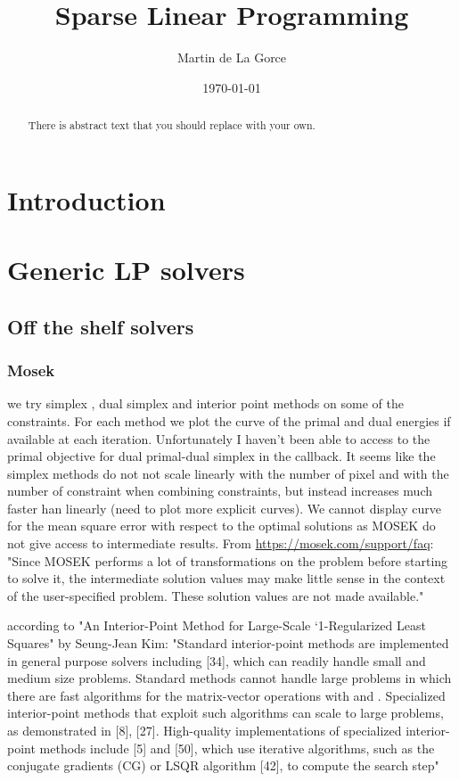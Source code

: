 \documentclass[11pt]{article}
\begin{document}
\title{Sparse Linear Programming}
\author{Martin de La Gorce}
\date{\today}
\maketitle

\begin{abstract}
    There is abstract text that you should replace with your own. 
\end{abstract}


\tableofcontents

\section{Introduction}


\section{Generic LP solvers}
 \subsection{Off the shelf solvers}
\subsubsection{Mosek}

we try simplex , dual simplex and interior point methods on some of the constraints. For each method we plot the curve of the primal and dual energies if available at each iteration. Unfortunately I haven't been able to access to the primal objective for dual primal-dual simplex in the callback. It seems like the simplex methods do not not scale linearly with the number of pixel and with the number of constraint when combining constraints, but instead increases much faster han linearly (need to plot more explicit curves).
We cannot display curve for the mean square error with respect to the optimal solutions as MOSEK do not give access to intermediate results. From \url{https://mosek.com/support/faq}: "Since MOSEK performs a lot of transformations on the problem before starting to solve it, the intermediate solution values may make little sense in the context of the user-specified problem. These solution values are not made available."



according to "An Interior-Point Method for Large-Scale
`1-Regularized Least Squares" by Seung-Jean Kim: 
"Standard interior-point methods are
implemented in general purpose solvers including [34],
which can readily handle small and medium size problems.
Standard methods cannot handle large problems in which there
are fast algorithms for the matrix-vector operations with
and . Specialized interior-point methods that exploit such
algorithms can scale to large problems, as demonstrated in
[8], [27]. High-quality implementations of specialized interior-
point methods include [5] and [50], which
use iterative algorithms, such as the conjugate gradients (CG)
or LSQR algorithm [42], to compute the search step"
\end{document}

